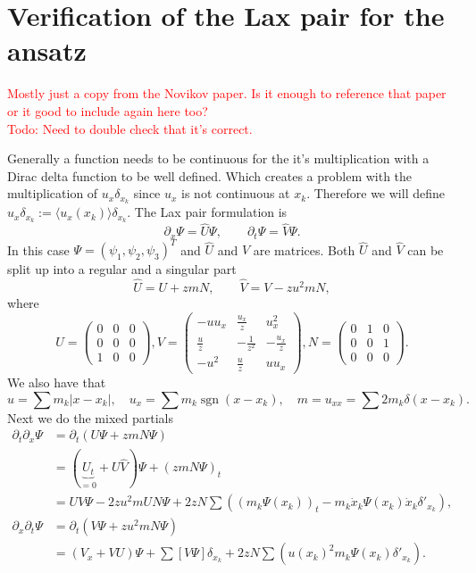 \documentclass[english,master]{liumaiex}
\theoremstyle{plain}
\theoremstyle{definition}
\newcommand\todo[1]{\textcolor{red}{#1}}
\DeclareMathOperator{\sgn}{sgn}
\begin{document}
\section{Verification of the Lax pair for the ansatz}

\todo{Mostly just a copy from the Novikov paper. Is it enough to reference that paper or it good to include again here too?} \\
\todo{Todo: Need to double check that it's correct.}

Generally a function needs to be continuous for the it's multiplication with a Dirac delta function to be well defined. Which creates a problem with the multiplication of $u_x \delta_{x_k}$ since $u_x$ is not continuous at $x_k$. Therefore we will define $u_x \delta_{x_k} := \langle u_x(x_k) \rangle \delta_{x_k}$. The Lax pair formulation is
\begin{equation}
	\partial_x \Psi = \hat{U} \Psi, \qquad \partial_t \Psi = \hat{V} \Psi.
\end{equation}
In this case $\Psi = (\psi_1, \psi_2, \psi_3)^T$ and $\hat{U}$ and $\hat{V}$ are matrices. Both $\hat{U}$ and $\hat{V}$ can be split up into a regular and a singular part
%
\begin{equation}
\hat{U} = U + zmN, \qquad \hat{V} = V - zu^2mN,
\end{equation}
where
\begin{equation}
U =
	\begin{pmatrix}
	0 & 0 & 0 \\
	0 & 0 & 0 \\
	1 & 0 & 0
	\end{pmatrix},
V = 
	\begin{pmatrix}
	-u u_x & \frac{u_x}{z} & u_x^2 \\
	\frac{u}{z} & - \frac{1}{z^2} & - \frac{u_x}{z} \\
	-u^2 & \frac{u}{z} & uu_x
	\end{pmatrix},
N =
	\begin{pmatrix}
	0 & 1 & 0 \\
	0 & 0 & 1 \\
	0 & 0 & 0
	\end{pmatrix}.
\end{equation}
%
We also have that
\begin{equation}
	u = \sum m_k |x - x_k|, \quad u_x = \sum m_k \sgn(x - x_k), \quad m = u_{xx} = \sum 2 m_k \delta(x - x_k).
\end{equation}
Next we do the mixed partials
\begin{equation}
\begin{aligned}
	\partial_t \partial_x \Psi &= \partial_t (U \Psi + zmN \Psi) \\ 
	&= (\underbrace{U_t}_{=0} + U\hat{V}) \Psi + (zm N \Psi)_t \\
	&= UV \Psi - 2zu^2mUN\Psi + 2zN\sum ((m_k \Psi(x_k))_t - m_k \dot{x}_k\Psi(x_k)\dot{x}_k\delta'_{x_k}), \\
	\partial_x \partial_t \Psi &= \partial_t (V \Psi + zu^2mN \Psi) \\
	&= (V_x + VU) \Psi + \sum [ V \Psi ] \delta_{x_k} + 2zN \sum(u(x_k)^2 m_k \Psi(x_k) \delta'_{x_k}).
\end{aligned}
\end{equation}
\end{document}
